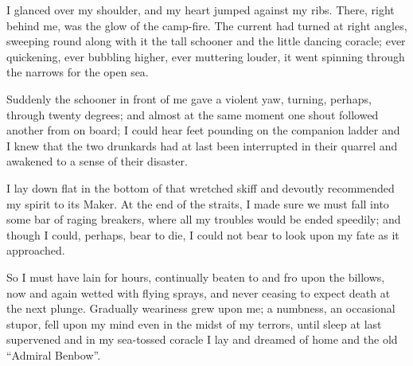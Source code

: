 I glanced over my shoulder, and my heart jumped against my ribs. There, right behind me, was the glow of the camp-fire. The current had turned at right angles, sweeping round along with it the tall schooner and the little dancing coracle; ever quickening, ever bubbling higher, ever muttering louder, it went spinning through the narrows for the open sea.

Suddenly the schooner in front of me gave a violent yaw, turning, perhaps, through twenty degrees; and almost at the same moment one shout followed another from on board; I could hear feet pounding on the companion ladder and I knew that the two drunkards had at last been interrupted in their quarrel and awakened to a sense of their disaster.

I lay down flat in the bottom of that wretched skiff and devoutly recommended my spirit to its Maker. At the end of the straits, I made sure we must fall into some bar of raging breakers, where all my troubles would be ended speedily; and though I could, perhaps, bear to die, I could not bear to look upon my fate as it approached.

So I must have lain for hours, continually beaten to and fro upon the billows, now and again wetted with flying sprays, and never ceasing to expect death at the next plunge. Gradually weariness grew upon me; a numbness, an occasional stupor, fell upon my mind even in the midst of my terrors, until sleep at last supervened and in my sea-tossed coracle I lay and dreamed of home and the old \enquote{Admiral Benbow}.